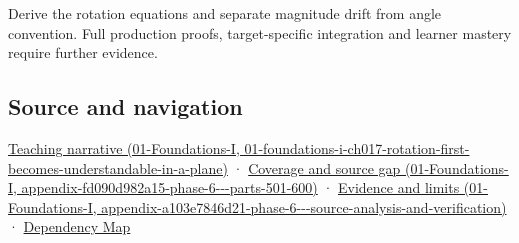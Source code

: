 Derive the rotation equations and separate magnitude drift from angle convention. Full production proofs, target-specific integration and learner mastery require further evidence.

\subsection{Source and navigation}\label{appendix-f77eadcc4a93-source-and-navigation}

\href{../01-Foundations-I/main.pdf\#nameddest=01-foundations-i-ch017-rotation-first-becomes-understandable-in-a-plane}{Teaching narrative (01-Foundations-I, 01-foundations-i-ch017-rotation-first-becomes-understandable-in-a-plane)} · \href{../01-Foundations-I/main.pdf\#nameddest=appendix-fd090d982a15-phase-6---parts-501-600}{Coverage and source gap (01-Foundations-I, appendix-fd090d982a15-phase-6-\/-\/-parts-501-600)} · \href{../01-Foundations-I/main.pdf\#nameddest=appendix-a103e7846d21-phase-6---source-analysis-and-verification}{Evidence and limits (01-Foundations-I, appendix-a103e7846d21-phase-6-\/-\/-source-analysis-and-verification)} · \hyperref[appendix-4ad47bdd269a]{Dependency Map}
